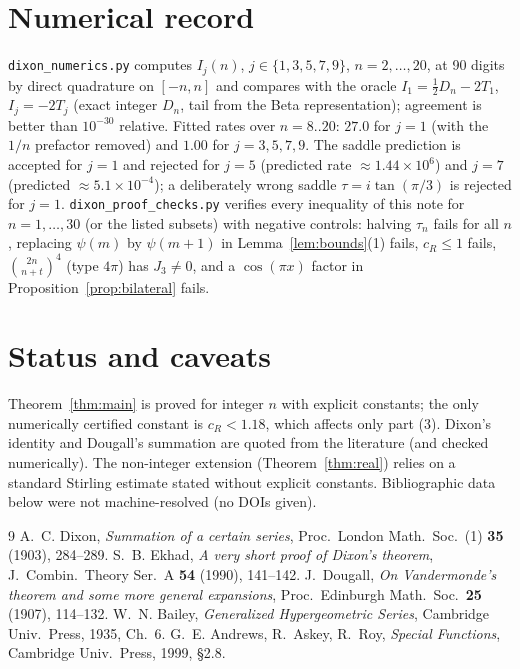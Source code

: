 \documentclass[11pt]{amsart}
\theoremstyle{remark}
\begin{document}
\section{Numerical record}\label{sec:num}
\texttt{dixon\_numerics.py} computes $I_j(n)$, $j\in\{1,3,5,7,9\}$, $n=2,\dots,20$, at 90 digits by direct quadrature on $[-n,n]$ and
compares with the oracle $I_1=\frac12D_n-2T_1$, $I_j=-2T_j$ (exact integer $D_n$, tail from the Beta representation); agreement is
better than $10^{-30}$ relative. Fitted rates over $n=8..20$: $27.0$ for $j=1$ (with the $1/n$ prefactor removed) and $1.00$ for
$j=3,5,7,9$. The saddle prediction is accepted for $j=1$ and rejected for $j=5$ (predicted rate $\approx1.44\times10^6$) and $j=7$ (predicted $\approx5.1\times10^{-4}$); a deliberately wrong saddle
$\tau=i\tan(\pi/3)$ is rejected for $j=1$. \texttt{dixon\_proof\_checks.py} verifies every inequality of this note for $n=1,\dots,30$
(or the listed subsets) with negative controls: halving $\tau_n$ fails for all $n$, replacing $\psi(m)$ by $\psi(m+1)$ in Lemma~\ref{lem:bounds}(1)
fails, $c_R\le1$ fails, $\binom{2n}{n+t}^4$ (type $4\pi$) has $J_3\ne0$, and a $\cos(\pi x)$ factor in Proposition~\ref{prop:bilateral} fails.

\section*{Status and caveats}
Theorem~\ref{thm:main} is proved for integer $n$ with explicit constants; the only numerically certified constant is $c_R<1.18$, which
affects only part (3). Dixon's identity and Dougall's summation are quoted from the literature (and checked numerically).
The non-integer extension (Theorem~\ref{thm:real}) relies on a standard Stirling estimate stated without explicit constants.
Bibliographic data below were not machine-resolved (no DOIs given).

\begin{thebibliography}{9}
 A.~C. Dixon, \emph{Summation of a certain series}, Proc.\ London Math.\ Soc.\ (1) \textbf{35} (1903), 284--289.
 S.~B. Ekhad, \emph{A very short proof of Dixon's theorem}, J.\ Combin.\ Theory Ser.\ A \textbf{54} (1990), 141--142.
 J.~Dougall, \emph{On Vandermonde's theorem and some more general expansions}, Proc.\ Edinburgh Math.\ Soc.\ \textbf{25} (1907), 114--132.
 W.~N. Bailey, \emph{Generalized Hypergeometric Series}, Cambridge Univ.\ Press, 1935, Ch.~6.
 G.~E. Andrews, R.~Askey, R.~Roy, \emph{Special Functions}, Cambridge Univ.\ Press, 1999, \S2.8.
\end{thebibliography}
\end{document}
